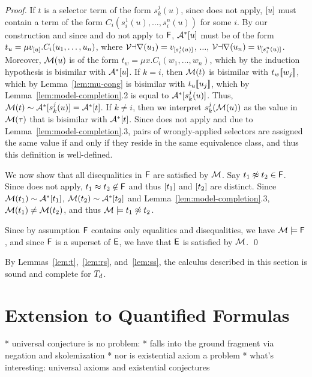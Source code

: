 \begin{proof}
If $t$ is a selector term of the form $s^j_k( u )$,
since  does not apply, 
$[ u ]$ must contain a term of the form $C_i( s^1_i( u ), \ldots, s^{n}_i( u ) )$ for some $i$.
By our construction and since  and  do not apply to $\mathsf{F}$, 
$\mathcal{A}^\ast [  u  ]$ must be of the form $t_u = \mu v_{[ u ]}. C_i( u_1, \ldots, u_n )$,
where $\mathcal{Var}( u_1 ) = v_{[ s^1_i(u) ]}$, $\ldots$, $\mathcal{Var}(u_n) = v_{[ s^n_i( u ) ]}$.
Moreover, $\mathcal{M}( u )$ is of the form $t_w = \mu x. C_i( w_1, \ldots, w_n )$,
which by the induction hypothesis is bisimilar with $\mathcal{A}^\ast [ u ]$.
If $k = i$, then $\mathcal{M}( t )$ is bisimilar with $t_w[\![ w_j ]\!]$,
which by Lemma~\ref{lem:mu-cong} is bisimilar with $t_u[\![ u_j ]\!]$,
which by Lemma~\ref{lem:model-completion}.2 is equal to $\mathcal{A}^\ast [  s^j_k( u ) ]$.
Thus, $\mathcal{M}( t ) \sim \mathcal{A}^\ast [  s^j_k( u ) ] = \mathcal{A}^\ast [ t ]$.
If $k \neq i$, then we interpret $s^j_k( \mathcal{M}( u ) )$ as the value in $\mathcal{M}( \tau )$ that is bisimilar with $\mathcal{A}^\ast [  t  ]$.
Since  does not apply and due to Lemma~\ref{lem:model-completion}.3, 
pairs of wrongly-applied selectors are assigned the same value if and only if they reside in the same equivalence class,
and thus this definition is well-defined.

We now show that all disequalities in $\mathsf{F}$ are satisfied by $\mathcal{M}$.
Say $t_1 \not\approx t_2 \in \mathsf{F}$.
Since  does not apply, $t_1 \approx t_2 \not\in \mathsf{F}$ and thus $[ t_1 ]$ and $[ t_2 ]$ are distinct.
Since $\mathcal{M}( t_1 ) \sim \mathcal{A}^\ast [ t_1 ]$, $\mathcal{M}( t_2 ) \sim \mathcal{A}^\ast [ t_2 ]$
and Lemma~\ref{lem:model-completion}.3, $\mathcal{M}( t_1 ) \neq \mathcal{M}( t_2 )$, and thus $\mathcal{M} \models t_1 \not\approx t_2$.

Since by assumption $\mathsf{F}$ contains only equalities and disequalities, we have $\mathcal{M} \models \mathsf{F}$,
and since $\mathsf{F}$ is a superset of $\mathsf{E}$, we have that $\mathsf{E}$ is satisfied by $\mathcal{M}$.
\qed
\end{proof}

By Lemmas~\ref{lem:t},~\ref{lem:rs}, and~\ref{lem:ss}, the calculus described in this section is sound and complete for $T_{d}$.

\section{Extension to Quantified Formulas}
\label{sec:extension-to-quantified-formulas}

  * universal conjecture is no problem:
    * falls into the ground fragment via negation
      and skolemization
  * nor is existential axiom a problem
  * what's interesting: universal axioms and existential conjectures

